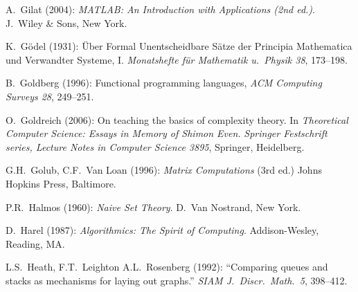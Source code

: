 \begin{thebibliography}{999}
A.~Gilat (2004):
{\it MATLAB: An Introduction with Applications (2nd ed.)}.
J.~Wiley \& Sons, New York.

K.~G\"{o}del (1931): \"{U}ber Formal Unentscheidbare S\"{a}tze der
Principia Mathematica und Verwandter Systeme, I.  {\it Monatshefte
f\"{u}r Mathematik u.~Physik 38}, 173--198.

B.~Goldberg (1996): Functional programming languages,  {\it ACM
  Computing Surveys 28}, 249--251.

O.~Goldreich (2006): On teaching the basics of complexity theory.  In
{\it Theoretical Computer Science: Essays in Memory of Shimon Even.}
{\it Springer Festschrift series, Lecture Notes in Computer Science
3895}, Springer, Heidelberg.

G.H.~Golub, C.F.~Van Loan (1996):
{\it Matrix Computations} (3rd ed.)
Johns Hopkins Press,  Baltimore.


P.R.~Halmos (1960):
{\it Naive Set Theory}.
D.~Van Nostrand, New York.

D.~Harel (1987): {\it Algorithmics: The Spirit of Computing}.
Addison-Wesley, Reading, MA.


L.S.~Heath, F.T.~Leighton A.L.~Rosenberg (1992): ``Comparing queues
and stacks as mechanisms for laying out graphs.''  {\it SIAM
  J.~Discr.~Math.~5}, 398--412.







\end{thebibliography}
